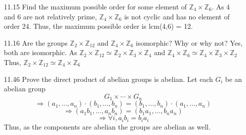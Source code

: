 \documentclass[12pt]{article}
\newcommand{\Z}{\mathds{Z}}
\begin{document}
\begin{enumerate}
	 \item[11.15] Find the maximum possible order for some element of $ \Z_4 \times \Z_6 $.
	  As 4 and 6 are not relatively prime, $ \Z_4 \times \Z_6 $ is not cyclic and has no element of order 24. Thus, the maximum possible order is lcm(4,6) = 12. 
	 \item[11.16] Are the groups $ \Z_2\times\Z_{12} $ and $ \Z_4\times\Z_6 $ isomorphic? Why or why not?
	  Yes, both are isomorphic. As $\Z_2 \times \Z_{12} \simeq \Z_2 \times \Z_3 \times \Z_4$ and $
	  \Z_4 \times \Z_6 \simeq \Z_4 \times \Z_3 \times \Z_2$\\
	  Thus,  $\Z_2 \times \Z_{12} \simeq \Z_4 \times \Z_6$
	 \item[11.46] Prove the direct product of abelian groups is abelian.
	 Let each $ G_i$ be an abelian group 
	 \[G_1 \times \cdots \times G_n\]
	 \[\Rightarrow(a_1, \dots, a_n) \cdot (b_1, \dots, b_n) = (b_1, \dots, b_n)  \cdot (a_1, \dots, a_n)\]
	 \[\Rightarrow(a_1b_1, \dots, a_nb_n) = (b_1a_1, \dots, b_na_n)\]
	 \[\Rightarrow \forall i, a_ib_i = b_ia_i \]
	 Thus, as the components are abelian the groups are abelian as well.
\end{enumerate}
\end{document}

